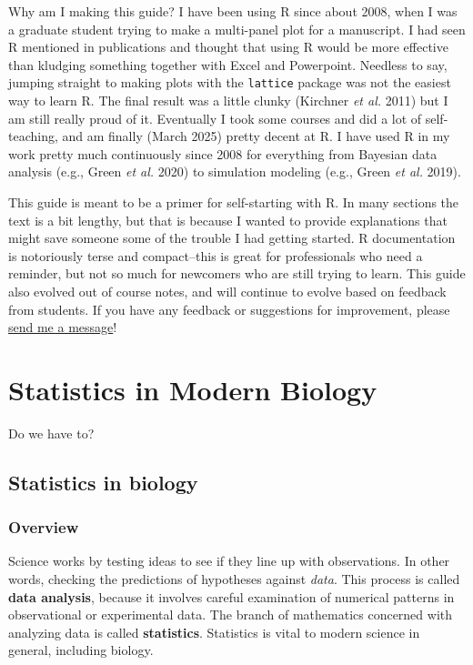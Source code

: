 \documentclass[
  13,
  letterpaper,
]{report}
\begin{document}
Why am I making this guide? I have been using R since about 2008, when I
was a graduate student trying to make a multi-panel plot for a
manuscript. I had seen R mentioned in publications and thought that
using R would be more effective than kludging something together with
Excel and Powerpoint. Needless to say, jumping straight to making plots
with the \texttt{lattice} package was not the easiest way to learn R.
The final result was a little clunky (Kirchner \emph{et al.} 2011) but I
am still really proud of it. Eventually I took some courses and did a
lot of self-teaching, and am finally (March 2025) pretty decent at R. I
have used R in my work pretty much continuously since 2008 for
everything from Bayesian data analysis (e.g., Green \emph{et al.} 2020)
to simulation modeling (e.g., Green \emph{et al.} 2019).

This guide is meant to be a primer for self-starting with R. In many
sections the text is a bit lengthy, but that is because I wanted to
provide explanations that might save someone some of the trouble I had
getting started. R documentation is notoriously terse and compact--this
is great for professionals who need a reminder, but not so much for
newcomers who are still trying to learn. This guide also evolved out of
course notes, and will continue to evolve based on feedback from
students. If you have any feedback or suggestions for improvement,
please \href{mailto:ngreen62@kennesaw.edu}{send me a message}!

\part{Statistics in Modern Biology}

Do we have to?

\chapter{Statistics in biology}\label{sec-intro}

\section{Overview}\label{sec-intro-over}

Science works by testing ideas to see if they line up with observations.
In other words, checking the predictions of hypotheses against
\emph{data}. This process is called \textbf{data analysis}, because it
involves careful examination of numerical patterns in observational or
experimental data. The branch of mathematics concerned with analyzing
data is called \textbf{statistics}. Statistics is vital to modern
science in general, including biology.
\end{document}

